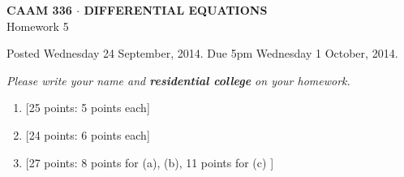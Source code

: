 \documentclass[10pt]{article}
\begin{document}
\vspace*{-5em}
\begin{center}
\large \textsf{\textbf{CAAM 336 $\cdot$ DIFFERENTIAL EQUATIONS}\\[0.5em]
Homework 5 }
\end{center}

Posted Wednesday 24 September, 2014.  Due 5pm Wednesday 1 October, 2014.
\begin{center}
\emph{Please write your name and \textbf{residential college} on your homework.}
\end{center}

\begin{enumerate}
\item {[25 points: 5 points each]}\\  
\vspace{1em}
\item {[24 points: 6 points each]}\\  
\item {[27 points: 8 points for (a), (b), 11 points for (c) ]}\\  
\newpage


\end{enumerate}
\end{document}
